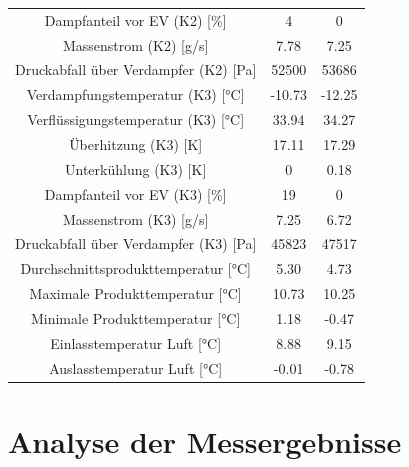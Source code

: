 \begin{table}[h!]
\begin{tabular}{|ccc|}
\multicolumn{1}{|c|}{Dampfanteil vor EV (K2) {[}\%{]}}          & \multicolumn{1}{c|}{4}      & 0             \\
\multicolumn{1}{|c|}{Massenstrom (K2) {[}g/s{]}}                & \multicolumn{1}{c|}{7.78}   & 7.25          \\
\multicolumn{1}{|c|}{Druckabfall über Verdampfer (K2) {[}Pa{]}} & \multicolumn{1}{c|}{52500}  & 53686         \\ \hline
\multicolumn{1}{|c|}{Verdampfungstemperatur (K3) {[}°C{]}}      & \multicolumn{1}{c|}{-10.73} & -12.25        \\
\multicolumn{1}{|c|}{Verflüssigungstemperatur (K3) {[}°C{]}}    & \multicolumn{1}{c|}{33.94}  & 34.27         \\
\multicolumn{1}{|c|}{Überhitzung (K3) {[}K{]}}                  & \multicolumn{1}{c|}{17.11}  & 17.29         \\
\multicolumn{1}{|c|}{Unterkühlung (K3) {[}K{]}}                 & \multicolumn{1}{c|}{0}      & 0.18          \\
\multicolumn{1}{|c|}{Dampfanteil vor EV (K3) {[}\%{]}}          & \multicolumn{1}{c|}{19}     & 0             \\
\multicolumn{1}{|c|}{Massenstrom (K3) {[}g/s{]}}                & \multicolumn{1}{c|}{7.25}   & 6.72          \\
\multicolumn{1}{|c|}{Druckabfall über Verdampfer (K3) {[}Pa{]}} & \multicolumn{1}{c|}{45823}  & 47517         \\ \hline
\multicolumn{1}{|c|}{Durchschnittsprodukttemperatur {[}°C{]}}   & \multicolumn{1}{c|}{5.30}   & 4.73          \\
\multicolumn{1}{|c|}{Maximale Produkttemperatur {[}°C{]}}       & \multicolumn{1}{c|}{10.73}  & 10.25         \\
\multicolumn{1}{|c|}{Minimale Produkttemperatur {[}°C{]}}       & \multicolumn{1}{c|}{1.18}   & -0.47         \\
\multicolumn{1}{|c|}{Einlasstemperatur Luft {[}°C{]}}           & \multicolumn{1}{c|}{8.88}   & 9.15          \\
\multicolumn{1}{|c|}{Auslasstemperatur Luft {[}°C{]}}           & \multicolumn{1}{c|}{-0.01}  & -0.78         \\ \hline
\end{tabular}
\end{table}








\chapter{Analyse der Messergebnisse}
\label{cha:Analyse der Messergebnisse}

